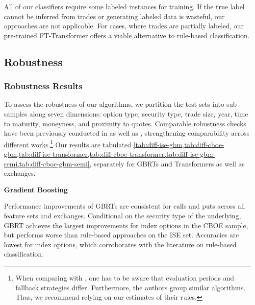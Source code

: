 All of our classifiers require some labeled instances for training. If the true label cannot be inferred from trades or generating labeled data is wasteful, our approaches are not applicable. For cases, where trades are partially labeled, our pre-trained FT-Transformer offers a viable alternative to rule-based classification.

\subsection{Robustness}\label{sec:robustness}


\subsubsection{Robustness Results}\label{sec:robustness-results}

To assess the robustness of our algorithms, we partition the test sets into sub-samples along seven dimensions: option type, security type, trade size, year, time to maturity, moneyness, and proximity to quotes. Comparable robustness checks have been previously conducted in \textcite[][47--50]{grauerOptionTradeClassification2022} as well as \textcite[][890--892]{savickasInferringDirectionOption2003}, strengthening comparability across different works.\footnote{When comparing with \textcite[][47--50]{grauerOptionTradeClassification2022}, one has to be aware that evaluation periods and fallback strategies differ. Furthermore, the authors group similar algorithms. Thus, we recommend relying on our estimates of their rules.} Our results are tabulated \cref{tab:diff-ise-gbm,tab:diff-cboe-gbm,tab:diff-ise-transformer,tab:diff-cboe-transformer,tab:diff-ise-gbm-semi,tab:diff-cboe-gbm-semi}, separately for \glspl{GBRT} and Transformers as well as exchanges.

\vskip 1.3in

\textbf{Gradient Boosting}

Performance improvements of \glspl{GBRT} are consistent for calls and puts across all feature sets and exchanges. Conditional on the security type of the underlying, \gls{GBRT} achieves the largest improvements for index options in the \gls{CBOE} sample, but performs worse than rule-based approaches on the \gls{ISE} set. Accuracies are lowest for index options, which corroborates with the literature on rule-based classification.

